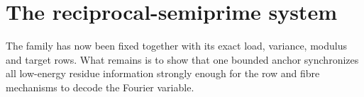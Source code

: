 \section{The reciprocal-semiprime system}

The family has now been fixed together with its exact load, variance, modulus and target rows.  What remains is to show that one bounded anchor synchronizes all low-energy residue information strongly enough for the row and fibre mechanisms to decode the Fourier variable.
